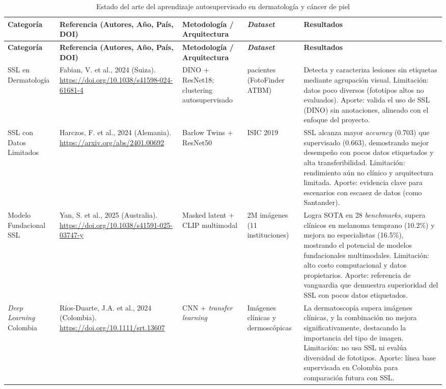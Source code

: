 \begingroup
\small
\singlespacing
\setlength{\tabcolsep}{4pt}
\begin{longtable}{@{}>{\raggedright\arraybackslash}p{}>{\raggedright\arraybackslash}p{}>{\raggedright\arraybackslash}p{}>{\raggedright\arraybackslash}p{}>{\raggedright\arraybackslash}p{}@{}}
\caption{Estado del arte del aprendizaje autosupervisado en dermatología y cáncer de piel}\label{tab:estado-arte}\\
\toprule
\textbf{Categoría} & \textbf{Referencia (Autores, Año, País, DOI)} & \textbf{Metodología / Arquitectura} & \textbf{\textit{Dataset}} & \textbf{Resultados} \\
\midrule
\endfirsthead
\toprule
\textbf{Categoría} & \textbf{Referencia (Autores, Año, País, DOI)} & \textbf{Metodología / Arquitectura} & \textbf{\textit{Dataset}} & \textbf{Resultados} \\
\midrule
\endhead
\bottomrule
\endfoot
SSL en Dermatología & Fabian, V. et al., 2024 (Suiza). \url{https://doi.org/10.1038/s41598-024-61681-4} & DINO + ResNet18; clustering autosupervisado & 90 pacientes (FotoFinder ATBM) & Detecta y caracteriza lesiones sin etiquetas mediante agrupación visual. Limitación: datos poco diversos (fototipos altos no evaluados). Aporte: valida el uso de SSL (DINO) sin anotaciones, alineado con el enfoque del proyecto. \\
\addlinespace
SSL con Datos Limitados & Harczos, F. et al., 2024 (Alemania). \url{https://arxiv.org/abs/2401.00692} & Barlow Twins + ResNet50 & ISIC 2019 & SSL alcanza mayor \textit{accuracy} (0.703) que supervisado (0.663), demostrando mejor desempeño con pocos datos etiquetados y alta transferibilidad. Limitación: rendimiento aún no clínico y arquitectura limitada. Aporte: evidencia clave para escenarios con escasez de datos (como Santander). \\
\addlinespace
Modelo Fundacional SSL & Yan, S. et al., 2025 (Australia). \url{https://doi.org/10.1038/s41591-025-03747-y} & Masked latent + CLIP multimodal & 2M imágenes (11 instituciones) & Logra SOTA en 28 \textit{benchmarks}, supera clínicos en melanoma temprano (10.2\%) y mejora no especialistas (16.5\%), mostrando el potencial de modelos fundacionales multimodales. Limitación: alto costo computacional y datos propietarios. Aporte: referencia de vanguardia que demuestra superioridad del SSL con pocos datos etiquetados. \\
\addlinespace
\textit{Deep Learning} Colombia & Ríos-Duarte, J.A. et al., 2024 (Colombia). \url{https://doi.org/10.1111/srt.13607} & CNN + \textit{transfer learning} & Imágenes clínicas y dermoscópicas & La dermatoscopía supera imágenes clínicas, y la combinación no mejora significativamente, destacando la importancia del tipo de imagen. Limitación: no usa SSL ni evalúa diversidad de fototipos. Aporte: línea base supervisada en Colombia para comparación futura con SSL. \\

\end{longtable}
